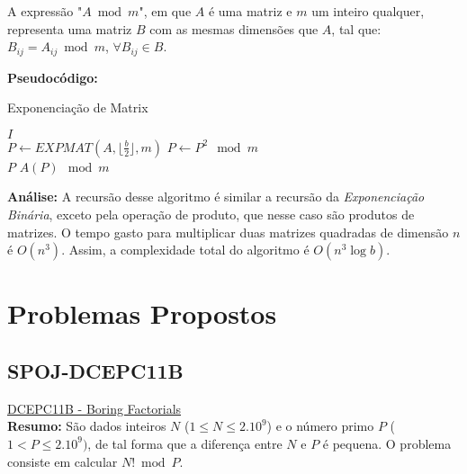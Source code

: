 \begin{definition}
A expressão "$A \bmod m$", em que $A$ é uma matriz e $m$ um inteiro qualquer, representa uma matriz $B$ com as mesmas dimensões que $A$, tal que: $B_{ij} = A_{ij} \bmod m$, $\forall B_{ij} \in B$.
\end{definition}

\textbf{Pseudocódigo:}
\begin{algorithm}
\caption{Exponenciação de Matrix}\label{exponenciacao_matrix}
\begin{algorithmic}[1]
\State \Return $I$ 
\EndIf 
\\
\State $P \gets EXPMAT(A, \lfloor \frac{b}{2} \rfloor, m)$
\State $P \gets P^2 \mod m$
\\
\State \Return $P$
\Else
\State \Return $A(P) \mod m$
\EndIf

\EndProcedure
\end{algorithmic}
\end{algorithm}


\textbf{Análise:}
A recursão desse algoritmo é similar a recursão da \textit{Exponenciação Binária}, exceto pela operação de produto, que nesse caso são produtos de matrizes. O tempo gasto para multiplicar duas matrizes quadradas de dimensão $n$ é $O(n^3)$. Assim, a complexidade total 
do algoritmo é $O(n^3 \log b)$.





\section{Problemas Propostos}



\subsection{SPOJ-DCEPC11B}
\href{http://www.spoj.com/problems/DCEPC11B/}{DCEPC11B - Boring Factorials}\\

\textbf{Resumo:}
São dados inteiros $N$ ($1\leq N \leq 2.10^9$) e o número primo $P$ ($1 < P \leq 2.10^9)$, de tal forma que a diferença entre $N$ e $P$ é pequena.
O problema consiste em calcular $N! \bmod P$.
\\

